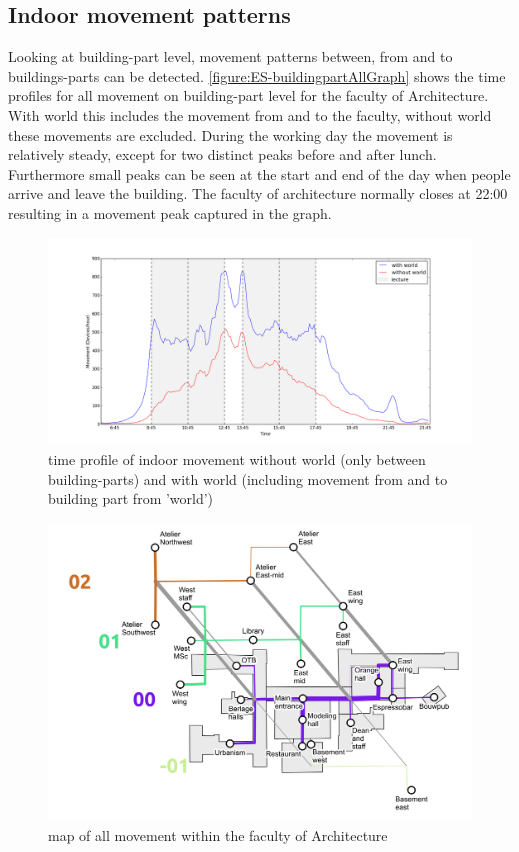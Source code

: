 \subsection{Indoor movement patterns}\label{ES-indoorMovement}
Looking at building-part level, movement patterns between, from and to buildings-parts can be detected. \autoref{figure:ES-buildingpartAllGraph} shows the time profiles for all movement on building-part level for the faculty of Architecture. With world this includes the movement from and to the faculty, without world these movements are excluded. During the working day the movement is relatively steady, except for two distinct peaks before and after lunch. Furthermore small peaks can be seen at the start and end of the day when people arrive and leave the building. The faculty of architecture normally closes at 22:00 resulting in a movement peak captured in the graph. 

\begin{figure}[H]
\centering
\includegraphics[scale=0.2]{buildingpart_all_graph.png}
\captionsetup{justification=centering}
\caption{time profile of indoor movement without world (only between building-parts) and with world (including movement from and to building part from 'world')}
\label{figure:ES-buildingpartAllGraph}
\end{figure}

\begin{figure}[H]
\centering
\includegraphics[scale=0.4]{bk_map_total.png}
\captionsetup{justification=centering}
\caption{map of all movement within the faculty of Architecture}
\label{figure:ES-buildingpartAllMap}
\end{figure}

